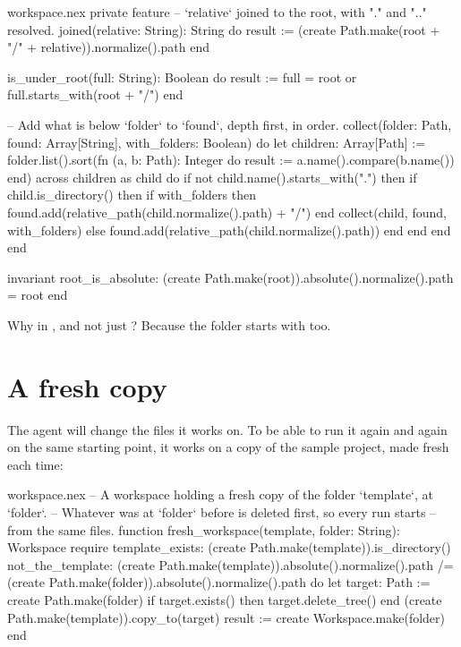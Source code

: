 \begin{continued}{workspace.nex}
  private feature
    -- `relative` joined to the root, with "." and ".." resolved.
    joined(relative: String): String do
      result := (create Path.make(root + "/" + relative)).normalize().path
    end

    is_under_root(full: String): Boolean do
      result := full = root or full.starts_with(root + "/")
    end

    -- Add what is below `folder` to `found`, depth first, in order.
    collect(folder: Path, found: Array[String], with_folders: Boolean) do
      let children: Array[Path] := folder.list().sort(fn (a, b: Path): Integer do
        result := a.name().compare(b.name())
      end)
      across children as child do
        if not child.name().starts_with(".") then
          if child.is_directory() then
            if with_folders then
              found.add(relative_path(child.normalize().path) + "/")
            end
            collect(child, found, with_folders)
          else
            found.add(relative_path(child.normalize().path))
          end
        end
      end
    end

invariant
  root_is_absolute: (create Path.make(root)).absolute().normalize().path = root
end
\end{continued}

Why  in , and not just ?
Because the folder  starts with
 too.

\section{A fresh copy}

The agent will change the files it works on. To be able to run it again
and again on the same starting point, it works on a copy of the sample
project, made fresh each time:

\begin{append}{workspace.nex}
-- A workspace holding a fresh copy of the folder `template`, at `folder`.
-- Whatever was at `folder` before is deleted first, so every run starts
-- from the same files.
function fresh_workspace(template, folder: String): Workspace
require
  template_exists: (create Path.make(template)).is_directory()
  not_the_template: (create Path.make(template)).absolute().normalize().path
    /= (create Path.make(folder)).absolute().normalize().path
do
  let target: Path := create Path.make(folder)
  if target.exists() then
    target.delete_tree()
  end
  (create Path.make(template)).copy_to(target)
  result := create Workspace.make(folder)
end
\end{append}

